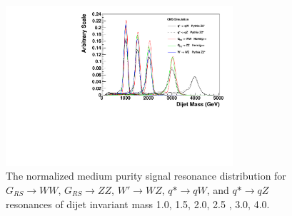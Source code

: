 
\begin{figure}[htb]
\begin{center}
\includegraphics[width=0.75\textwidth]{EXO-12-024/figs/signal-acc-eff/resonance-shape-medium.pdf}
\end{center}
\caption{The normalized medium purity signal resonance distribution for  $G_{RS}\to WW$, $G_{RS}\to ZZ$, $W' \to WZ$, $q*\to qW$, and $q*\to qZ$ resonances of dijet invariant mass 1.0\TeVcc, 1.5\TeVcc, 2.0\TeVcc, 2.5 \TeVcc,  3.0\TeVcc, 4.0\TeVcc.
}
\label{fig:mediumsignalShapes}
\end{figure}


